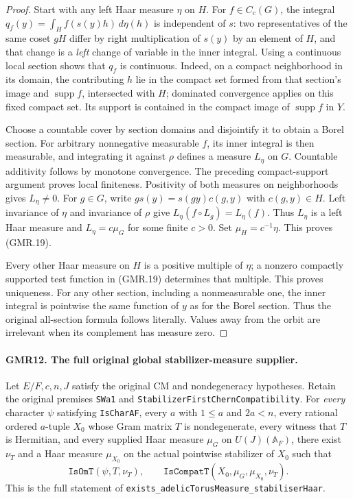 \begin{proof}
Start with any left Haar measure $\eta$ on $H$.  For $f\in C_c(G)$,
the integral $q_f(y)=\int_H f(s(y)h)\,d\eta(h)$ is independent of $s$:
two representatives of the same coset $gH$ differ by right
multiplication of $s(y)$ by an element of $H$, and that change is a
\emph{left} change of variable in the inner integral.
Using a continuous local section shows that $q_f$ is continuous.
Indeed, on a compact neighborhood in its domain, the contributing
$h$ lie in the compact set formed from that section's image and
$\operatorname{supp}f$, intersected with $H$; dominated convergence
applies on this fixed compact set.  Its support is contained in the
compact image of $\operatorname{supp}f$ in $Y$.

Choose a countable cover by section domains and disjointify it to
obtain a Borel section.  For arbitrary nonnegative measurable $f$, its
inner integral is then measurable, and integrating it against $\rho$
defines a measure $L_\eta$ on $G$.  Countable additivity follows by
monotone convergence.  The preceding compact-support argument proves
local finiteness.  Positivity of both measures on neighborhoods gives
$L_\eta\ne0$.
For $g\in G$, write $g s(y)=s(gy)c(g,y)$ with $c(g,y)\in H$.
Left invariance of $\eta$ and invariance of $\rho$ give
$L_\eta(f\circ L_g)=L_\eta(f)$.  Thus $L_\eta$ is a left Haar measure
and $L_\eta=c\mu_G$ for some finite $c>0$.
Set $\mu_H=c^{-1}\eta$.  This proves (GMR.19).

Every other Haar measure on $H$ is a positive multiple of $\eta$;
a nonzero compactly supported test function in (GMR.19) determines
that multiple.  This proves uniqueness.  For any other section,
including a nonmeasurable one, the inner integral is pointwise the
same function of $y$ as for the Borel section.  Thus the original
all-section formula follows literally.  Values away from the orbit
are irrelevant when its complement has measure zero.
\end{proof}

\paragraph{GMR12. The full original global stabilizer-measure supplier.}
\label{claim:GMR12}
Let $E/F,c,n,J$ satisfy the original CM and nondegeneracy hypotheses.
Retain the original premises \texttt{SWa1} and
\texttt{StabilizerFirstChernCompatibility}.  For \emph{every} character
$\psi$ satisfying \texttt{IsCharAF}, every $a$ with $1\leq a$ and
$2a<n$, every rational ordered $a$-tuple $X_0$ whose Gram matrix
$T$ is nondegenerate, every witness that $T$ is Hermitian, and every
supplied Haar measure $\mu_G$ on $U(J)(\mathbb A_F)$, there exist
$\nu_T$ and a Haar measure $\mu_{X_0}$ on the actual pointwise
stabilizer of $X_0$ such that
\[
 \texttt{IsOmT}(\psi,T,\nu_T),\qquad
 \texttt{IsCompatT}(X_0,\mu_G,\mu_{X_0},\nu_T).
 \tag{GMR.20}
\]
This is the full statement of
\texttt{exists\_adelicTorusMeasure\_stabiliserHaar}.

